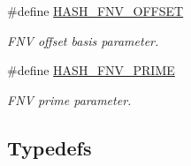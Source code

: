 \begin{CompactItemize}
\#define \hyperlink{group__dbprim__hash_ga50}{HASH\_\-FNV\_\-OFFSET}
\begin{CompactList}\small\item\em FNV offset basis parameter. \item\end{CompactList}\item 
\#define \hyperlink{group__dbprim__hash_ga51}{HASH\_\-FNV\_\-PRIME}
\begin{CompactList}\small\item\em FNV prime parameter. \item\end{CompactList}\end{CompactItemize}
\subsection*{Typedefs}
